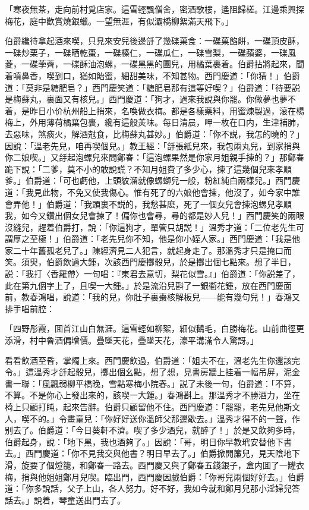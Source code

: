 「寒夜無茶，走向前村覓店家。這雪輕飄僧舍，密酒歌樓，遙阻歸槎。江邊乘興探梅花，庭中歡賞燒銀蠟。一望無涯，有似灞橋柳絮滿天飛下。」

伯爵纔待拿起酒來喫，只見來安兒後邊㧱了幾碟菓食：一碟菓餡餅，一碟頂皮酥，一碟炒栗子，一碟晒乾棗，一碟榛仁，一碟瓜仁，一碟雪梨，一碟蘋婆，一碟風菱，一碟荸薺，一碟酥油泡螺，一碟黑黑的團兒，用橘葉裹着。伯爵拈將起來，聞着噴鼻香，喫到口，猶如飴蜜，細甜美味，不知甚物。西門慶道：「你猜！」伯爵道：「莫非是糖肥皂？」西門慶笑道：「糖肥皂那有這等好喫？」伯爵道：「待要説是梅蘇丸，裏面又有核兒。」西門慶道：「狗才，過來我說與你罷。你做夢也夢不着，是昨日小价杭州船上捎來，名喚做衣梅。都是各樣藥料，用蜜煉製過，滚在楊梅上，外用薄荷橘葉包裹，纔有這般羙味。每日清晨，呷一枚在口内，生津補肺，去惡味，煞痰火，解酒尅食，比梅蘇丸甚妙。」伯爵道：「你不説，我怎的曉的？」因說：「溫老先兒，咱再喫個兒。」教王經：「㧱張紙兒來，我包兩丸兒，到家捎與你二娘喫。」又㧱起泡螺兒來問鄭春：「這泡螺果然是你家月姐親手揀的？」那鄭春跪下說：「二爹，莫不小的敢說謊？不知月姐費了多少心，揀了這幾個兒來孝順爹。」伯爵道：「可也虧他，上頭紋溜就像螺螄兒一般，粉紅純白兩樣兒。」西門慶道：「我見此物，不免又使我傷心。惟有死了的六娘他會揀，他沒了，如今家中誰會弄他！」伯爵道：「我頭裏不説的，我愁甚麽，死了一個女兒會揀泡螺兒孝順我，如今又鑽出個女兒會揀了！偏你也會尋，尋的都是妙人兒！」西門慶笑的兩眼沒縫兒，趕着伯爵打，說：「你這狗才，單管只胡説！」溫秀才道：「二位老先生可謂厚之至極！」伯爵道：「老先兒你不知，他是你小姪人家。」西門慶道：「我是他家二十年舊孤老兒了。」陳經濟見二人犯言，就起身走了。那溫秀才只是掩口而笑。須臾，伯爵飲過大鍾，次該西門慶擲骰兒，於是擲出個七點來。想了半日，説：「我打〈香羅帶〉一句唱：『東君去意切，梨花似雪。』」伯爵道：「你説差了，此在第九個字上了，且喫一大鍾。」於是流沿兒斟了一銀衢花鍾，放在西門慶面前，教春鴻唱，說道：「我的兒，你肚子裏棗核解板兒——能有幾句兒！」春鴻又排手唱前腔：

「四野彤霞，囬首江山白無涯。這雪輕如柳絮，細似鵝毛，白勝梅花。山前曲徑更添滑，村中魯酒偏增價。疊墜天花，疊墜天花，濠平溝滿令人驚訝。」

看看飲酒至昏，掌燭上來。西門慶飲過，伯爵道：「姐夫不在，溫老先生你還該完令。」這溫秀才㧱起骰兒，擲出個幺點，想了想，見書房牆上挂着一幅吊屏，泥金書一聯：「風飄弱柳平橋晚，雪點寒梅小院春。」説了未後一句，伯爵道：「不算，不算。不是你心上發出來的，該喫一大鍾。」春鴻斟上。那溫秀才不勝酒力，坐在椅上只顧打盹，起來告辭。伯爵只顧留他不住。西門慶道：「罷罷，老先兒他斯文人，喫不的。」令畫童兒：「你好好送你溫師父那邊歇去。」溫秀才得不的一聲，作别去了。伯爵道：「今日葵軒不濟。喫了多少酒兒，就醉了！」於是又飲夠多時，伯爵起身，說：「地下黑，我也酒夠了。」因說：「哥，明日你早教玳安替他下書去。」西門慶道：「你不見我交與他書？明日早去了。」伯爵掀開簾兒，見天陰地下滑，旋要了個燈籠，和鄭春一路去。西門慶又與了鄭春五錢銀子，盒内囬了一罐衣梅，捎與他姐姐鄭月兒喫。臨出門，西門慶因戲伯爵：「你哥兒兩個好好去。」伯爵道：「你多說話，父子上山，各人努力。好不好，我如今就和鄭月兒那小淫婦兒答話去。」說着，琴童送出門去了。

